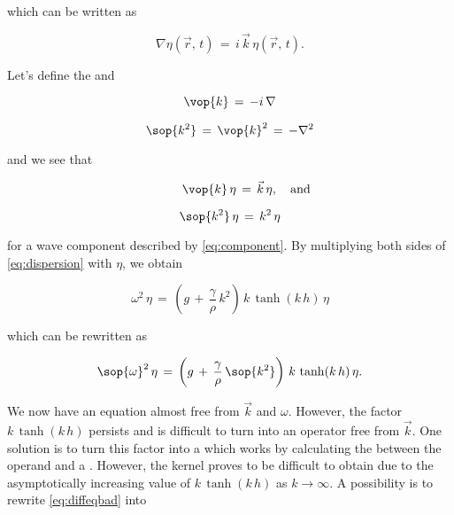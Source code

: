 which can be written as

\begin{equation}
\nabla\eta(\vec{r},\,t) \,=\, i\,\vec{k}\,\eta(\vec{r},\,t).
\end{equation}

Let's define the  and 

\begin{samepage}
\begin{equation} \label{eq:opkvec}
\vop{k} \,=\, -i\,\nabla
\end{equation}

\begin{equation} \label{eq:opk2}
\sop{k^2} \,=\, \vop{k}^2 \,=\, -\nabla^2
\end{equation}
\end{samepage}

and we see that 

\begin{samepage}
\begin{equation} \label{eq:opkvec1action}
\phantom{and}\quad\vop{k}\,\eta \,=\, \vec{k}\,\eta,\quad\text{and}
\end{equation}

\begin{equation} \label{eq:opk2action}
\sop{k^2}\,\eta \,=\, k^2\,\eta
\end{equation}
\end{samepage}

for a wave component described by \eqref{eq:component}. By multiplying both sides of \eqref{eq:dispersion} with $\eta$, we obtain

\begin{equation}
\omega^2\,\eta \,=\, \left(g\,+\,\frac{\gamma}{\rho}\,k^2\right)\,k\,\tanh(k\,h)\,\eta
\end{equation}

which can be rewritten as

\begin{equation} \label{eq:diffeqbad}
\sop{\omega}^2\,\eta \,=\, \left(g\,+\,\frac{\gamma}{\rho}\,\sop{k^2}\right)\,k\,\tanh(k\,h)\,\eta.
\end{equation}

We now have an equation almost free from $\vec{k}$ and $\omega$. However, the factor $k\,\tanh(k\,h)$ persists and is difficult to turn into an operator free from $\vec{k}$. One solution is to turn this factor into a  which works by calculating the  between the operand and a . However, the kernel proves to be difficult to obtain due to the asymptotically increasing value of $k\,\tanh(k\,h)$ as $k\rightarrow\infty$. A possibility is to rewrite \eqref{eq:diffeqbad} into

